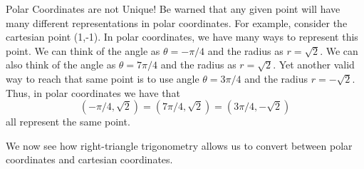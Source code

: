 \begin{example}{Polar Coordinates are not Unique!}
Be warned that any given point will have many different representations in polar coordinates.  For example, consider the cartesian point (1,-1).  In polar coordinates, we have many ways to represent this point.  We can think of the angle as $\theta=-\pi/4$ and the radius as $r=\sqrt{2}$.  We can also think of the angle as $\theta=7\pi/4$ and the radius as $r=\sqrt{2}$.  Yet another valid way to reach that same point is to use angle $\theta=3\pi/4$ and the radius $r=-\sqrt{2}$.  Thus, in polar coordinates we have that $$\left(-\pi/4,\sqrt{2}\right)=\left(7\pi/4,\sqrt{2}\right)=\left(3\pi/4,-\sqrt{2}\right) $$ all represent the same point.
\end{example}

We now see how right-triangle trigonometry allows us to convert between polar coordinates and cartesian coordinates.


